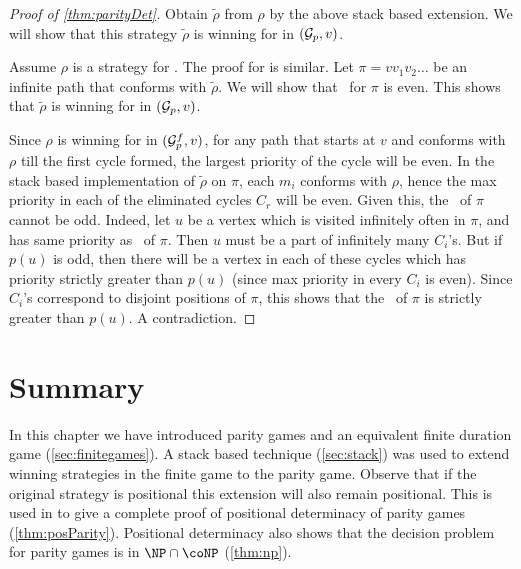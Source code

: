 \begin{proof}[Proof of \autoref{thm:parityDet}]
    Obtain $\tilde{\rho}$ from $\rho$ by the above stack based extension. We will show that this strategy $ \tilde{\rho}$ is winning for  in $(\mathcal{G}_p,v)$.

    Assume $\rho$ is a strategy for . The proof for  is similar. Let $\pi = v v_1 v_2 \ldots $ be an infinite path that conforms with $\tilde{\rho}$. We will show that \mip\ for $\pi$ is even. This shows that $\tilde{\rho}$ is winning for  in $(\mathcal{G}_p,v)$.

    Since $\rho$ is winning for  in $(\mathcal{G}^f_p,v)$, for any path that starts at $v$ and conforms with $\rho$ till the first cycle formed, the largest priority of the cycle will be even. In the stack based implementation of $ \tilde{\rho}$ on $\pi$, each $m_i$ conforms with $\rho$, hence the max priority in each of the eliminated cycles $C_r$ will be even. Given this, the \mip\ of $\pi$ cannot be odd. Indeed, let $u$ be a vertex which is visited infinitely often in $\pi$, and has same priority as \mip\ of $\pi$. Then $u$ must be a part of infinitely many $C_i$'s. But if $p(u)$ is odd, then there will be a vertex in each of these cycles which has priority strictly greater than $p(u)$ (since max priority in every $C_i$ is even). Since $C_i$'s correspond to disjoint positions of $\pi$, this shows that the \mip\ of $\pi$ is strictly greater than $p(u)$. A contradiction.

\end{proof}

\section{Summary}
In this chapter we have introduced parity games and an equivalent finite duration game (\autoref{sec:finitegames}). A stack based technique (\autoref{sec:stack}) was used to extend winning strategies in the finite game to the parity game. Observe that if the original strategy is positional this extension will also remain positional. This is used in \cite{bjorklund_memoryless_2004} to give a complete proof of positional determinacy of parity games (\autoref{thm:posParity}). Positional determinacy also shows that the decision problem for parity games is in $\NP \cap \coNP$ (\autoref{thm:np}).

